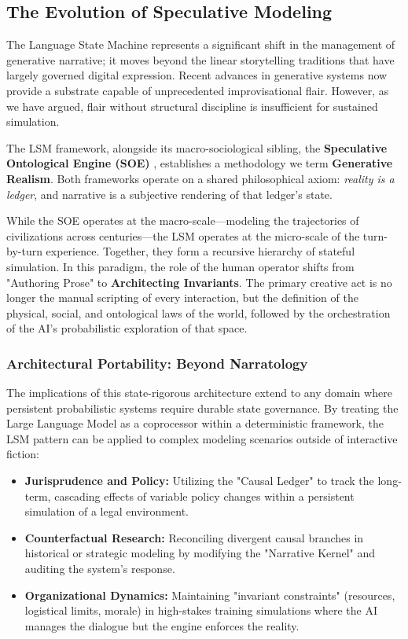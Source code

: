 \documentclass[12pt, a4paper]{article}
\begin{document}
\subsection{The Evolution of Speculative Modeling}

The Language State Machine represents a significant shift in the management of generative narrative; it moves beyond the linear storytelling traditions that have largely governed digital expression. Recent advances in generative systems now provide a substrate capable of unprecedented improvisational flair. However, as we have argued, flair without structural discipline is insufficient for sustained simulation. 

The LSM framework, alongside its macro-sociological sibling, the \textbf{Speculative Ontological Engine (SOE)} \citep{bee2025soe}, establishes a methodology we term \textbf{Generative Realism}. Both frameworks operate on a shared philosophical axiom: \textit{reality is a ledger}, and narrative is a subjective rendering of that ledger's state. 

While the SOE operates at the macro-scale---modeling the trajectories of civilizations across centuries---the LSM operates at the micro-scale of the turn-by-turn experience. Together, they form a recursive hierarchy of stateful simulation. In this paradigm, the role of the human operator shifts from "Authoring Prose" to \textbf{Architecting Invariants}. The primary creative act is no longer the manual scripting of every interaction, but the definition of the physical, social, and ontological laws of the world, followed by the orchestration of the AI’s probabilistic exploration of that space.

\subsubsection{Architectural Portability: Beyond Narratology}

The implications of this state-rigorous architecture extend to any domain where persistent probabilistic systems require durable state governance. By treating the Large Language Model as a coprocessor within a deterministic framework, the LSM pattern can be applied to complex modeling scenarios outside of interactive fiction:
\begin{itemize}
    \item \textbf{Jurisprudence and Policy:} Utilizing the "Causal Ledger" to track the long-term, cascading effects of variable policy changes within a persistent simulation of a legal environment.
    \item \textbf{Counterfactual Research:} Reconciling divergent causal branches in historical or strategic modeling by modifying the "Narrative Kernel" and auditing the system's response.
    \item \textbf{Organizational Dynamics:} Maintaining "invariant constraints" (resources, logistical limits, morale) in high-stakes training simulations where the AI manages the dialogue but the engine enforces the reality.
\end{itemize}
\end{document}
